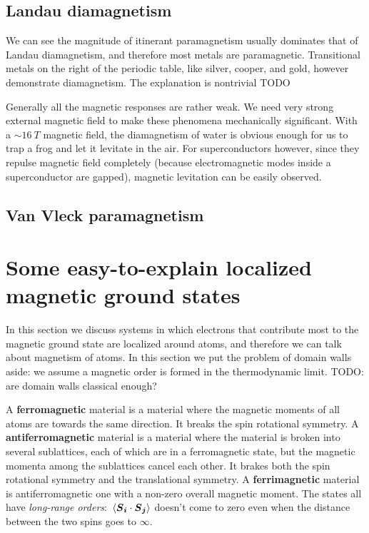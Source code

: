 \documentclass[hyperref, a4paper]{article}
\newcommand*{\concept}[1]{{\textbf{#1}}}
\begin{document}
\subsection{Landau diamagnetism}

We can see the magnitude of itinerant paramagnetism usually dominates that of Landau diamagnetism,
and therefore most metals are paramagnetic. 
Transitional metals on the right of the periodic table, like silver, cooper, and gold,
however demonstrate diamagnetism.
The explanation is nontrivial TODO

Generally all the magnetic responses are rather weak. 
We need very strong external magnetic field 
to make these phenomena mechanically significant.
With a $\sim \SI{16}{T}$ magnetic field,
the diamagnetism of water is obvious enough 
for us to trap a frog and let it levitate in the air.
For superconductors however, 
since they repulse magnetic field completely
(because electromagnetic modes inside a superconductor are gapped),
magnetic levitation can be easily observed.

\subsection{Van Vleck paramagnetism}

\section{Some easy-to-explain localized magnetic ground states}

In this section we discuss systems in which 
electrons that contribute most to the magnetic ground state 
are localized around atoms,
and therefore we can talk about magnetism of atoms.
In this section we put the problem of domain walls aside: 
we assume a magnetic order is formed in the thermodynamic limit. TODO: are domain walls classical enough?

A \concept{ferromagnetic} material is a material 
where the magnetic moments of all atoms are towards the same direction.
It breaks the spin rotational symmetry.
A \concept{antiferromagnetic} material is a material
where the material is broken into several sublattices,
each of which are in a ferromagnetic state,
but the magnetic momenta among the sublattices cancel each other.
It brakes both the spin rotational symmetry 
and the translational symmetry.
A \concept{ferrimagnetic} material is antiferromagnetic one with a non-zero overall magnetic moment.
The states all have \emph{long-range orders}:
$\expval*{\vb*{S}_{\vb*{i}} \cdot \vb*{S}_{\vb*{j}}}$ doesn't come to zero 
even when the distance between the two spins goes to $\infty$.
\end{document}
